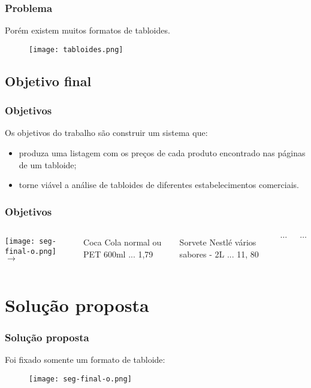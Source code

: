 \documentclass{beamer}
\begin{document}
\begin{frame}
    \frametitle{Problema}
    Porém existem muitos formatos de tabloides.
    \begin{figure}[!ht]
    \begin{center}
        \texttt{[image: tabloides.png]}
    \end{center}
    \end{figure}
\end{frame}

\subsection{Objetivo final}

\begin{frame}
    \frametitle{Objetivos}
    Os objetivos do trabalho são construir um sistema que:
    \pause
    \begin{itemize}
        \item produza uma listagem com os preços de cada produto encontrado nas páginas de um tabloide;
        \pause
        \item torne viável a análise de tabloides de diferentes estabelecimentos comerciais.
    \end{itemize}
\end{frame}

\begin{frame}
    \frametitle{Objetivos}
    
    \begin{columns}[c]
        \column{100pt} {
            \texttt{[image: seg-final-o.png]}
        }
        \column{3pt} {
            $\rightarrow$
        }
        \column{200pt} {
            Coca Cola normal ou PET 600ml ... 1,79
            
            Sorvete Nestlé vários sabores - 2L ... 11, 80
            
            $\dots$
            
            $\dots$
        }
    \end{columns} 

\end{frame}

\section{Solução proposta}

\begin{frame}
    \frametitle{Solução proposta}
    Foi fixado somente um formato de tabloide:
    \begin{figure}[!ht]
    \begin{center}
        \texttt{[image: seg-final-o.png]}
    \end{center}
    \end{figure}
\end{frame}
\end{document}
